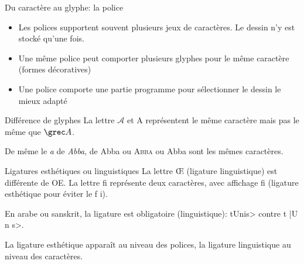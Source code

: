 \begin{frame}{Du caractère au glyphe: la police}
  \begin{itemize}
  \item Les polices supportent souvent plusieurs jeux de caractères. Le
    dessin n'y est stocké qu'une fois.
  \item[\dialogerror] Une même police peut comporter plusieurs glyphes pour le même caractère (formes décoratives)
  \item Une police comporte une partie programme pour sélectionner le dessin le mieux adapté
  \end{itemize}
  \begin{block}{Différence de glyphes}
    La lettre {\Large{$\mathcal{A}$}} et {\Large{A}} représentent le
    même caractère mais pas le même que $\Alpha$.

    De même le \emph{a} de \emph{Abba}, de {\selectfont
      Abba} ou \textsc{Abba} ou \textrm{Abba} sont les mêmes caractères.
  \end{block}

  \begin{block}{Ligatures esthétiques ou linguistiques}
    La lettre {\Large\OE{}} (ligature linguistique) est différente de
    {\Large{OE}}. La lettre {\textrm{\Large f{}i}} représente deux caractères,
    avec affichage \textrm{\Large{fi}} (ligature esthétique pour éviter le
    \textrm{\Large{f\kern -1pt i}}).

    En arabe ou sanskrit, la ligature est obligatoire (linguistique):
    \novocalize
    \<tUnis> contre \<t |U n s>.

    La ligature esthétique apparaît au niveau des polices, la ligature
    linguistique au niveau des caractères.
  \end{block}
\end{frame}
